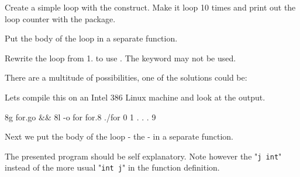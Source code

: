 \begin{Exercise}[title={For-loop},difficulty=1]
\label{ex:for-loop}
\Question \label{ex:for-loop q1} Create a simple loop with the  construct. Make it loop
10 times and print out the loop counter with the  package.

\Question \label{ex:for-loop q2} Put the body of the loop in a separate function.

\Question \label{ex:for-loop q3} Rewrite the loop from 1. to use . The
keyword  may not be used.
\end{Exercise}

\begin{Answer}

\Question There are a multitude of possibilities, 
one of the solutions could be:

Lets compile this on an Intel 386 Linux machine and look at the
output.
\begin{display}
\pr 8g for.go && 8l -o for for.8
\pr ./for
0
1
.
.
.
9
\end{display}

\Question Next we put the body of the 
loop - the  - in a separate function.

The presented program should be self explanatory. Note however the
"\lstinline{j int}" instead of the more usual "\lstinline{int j}" in the
function definition.
\end{Answer}
